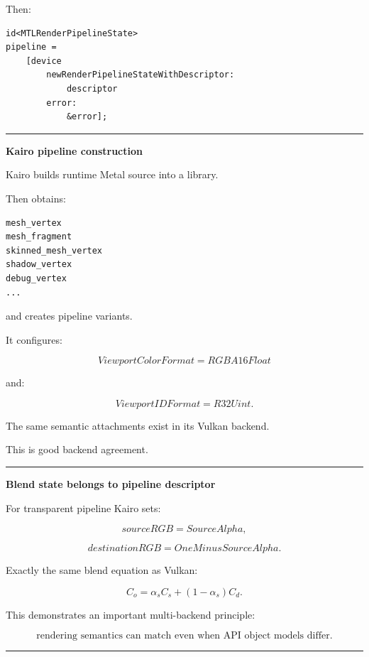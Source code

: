 Then:

\begin{verbatim}
id<MTLRenderPipelineState>
pipeline =
    [device
        newRenderPipelineStateWithDescriptor:
            descriptor
        error:
            &error];
\end{verbatim}

\begin{center}\rule{0.5\linewidth}{0.5pt}\end{center}

\textbf{Kairo pipeline construction}

Kairo builds runtime Metal source into a library.

Then obtains:

\begin{verbatim}
mesh_vertex
mesh_fragment
skinned_mesh_vertex
shadow_vertex
debug_vertex
...
\end{verbatim}

and creates pipeline variants.

It configures:

\[
ViewportColorFormat=RGBA16Float
\]

and:

\[
ViewportIDFormat=R32Uint.
\]

The same semantic attachments exist in its Vulkan backend.

This is good backend agreement.

\begin{center}\rule{0.5\linewidth}{0.5pt}\end{center}

\textbf{Blend state belongs to pipeline descriptor}

For transparent pipeline Kairo sets:

\[
sourceRGB=
SourceAlpha,
\]

\[
destinationRGB=
OneMinusSourceAlpha.
\]

Exactly the same blend equation as Vulkan:

\[
C_o=
\alpha_s C_s
+
(1-\alpha_s)C_d.
\]

This demonstrates an important multi-backend principle:

\[
\boxed{
\text{rendering semantics can match even when API object models differ}.
}
\]

\begin{center}\rule{0.5\linewidth}{0.5pt}\end{center}

\textbf{}

